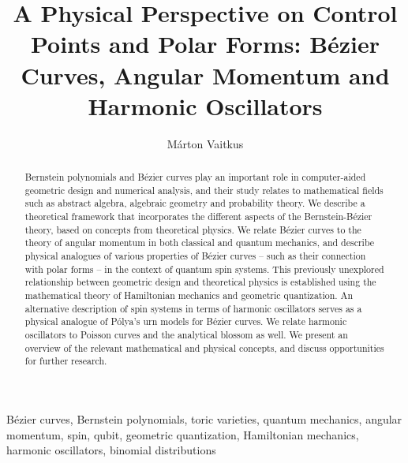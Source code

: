 \documentclass[final,3p,mathptmx]{elsarticle}
\begin{document}
\begin{frontmatter}

\title{A Physical Perspective on Control Points and Polar Forms: B\'{e}zier Curves, Angular Momentum and Harmonic Oscillators}


\author{Márton Vaitkus}
\address{Budapest University of Technology and Economics}


\begin{abstract}
Bernstein polynomials and B\'{e}zier curves play an important role in computer-aided geometric design and numerical analysis, and their study relates to mathematical fields such as abstract algebra, algebraic geometry and probability theory. We describe a theoretical framework that incorporates the different aspects of the Bernstein-B\'{e}zier theory, based on concepts from theoretical physics. We relate B\'{e}zier curves to the theory of angular momentum in both classical and quantum mechanics, and describe physical analogues of various properties of B\'{e}zier curves -- such as their connection with polar forms -- in the context of quantum spin systems. This previously unexplored relationship between geometric design and theoretical physics is established using the mathematical theory of Hamiltonian mechanics and geometric quantization. An alternative description of spin systems in terms of harmonic oscillators serves as a physical analogue of P\'{o}lya's urn models for B\'{e}zier curves. We relate harmonic oscillators to Poisson curves and the analytical blossom as well. We present an overview of the relevant mathematical and physical concepts, and discuss opportunities for further research.
\end{abstract}

\begin{keyword}
B\'{e}zier curves, Bernstein polynomials, toric varieties, quantum mechanics, angular momentum, spin, qubit, geometric quantization, Hamiltonian mechanics, harmonic oscillators, binomial distributions
\end{keyword}

\end{frontmatter}

\end{document}
